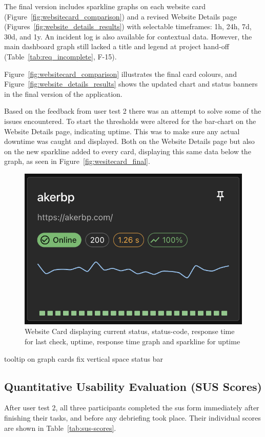 The final version includes sparkline graphs on each website card (Figure~\ref{fig:websitecard_comparison}) and a revised Website Details page (Figures~\ref{fig:website_details_results}) with selectable timeframes: 1h, 24h, 7d, 30d, and 1y.  
An incident log is also available for contextual data.  
However, the main dashboard graph still lacked a title and legend at project hand-off (Table~\ref{tab:req_incomplete}, F-15).

Figure~\ref{fig:websitecard_comparison} illustrates the final card colours, and Figure~\ref{fig:website_details_results} shows the updated chart and status banners in the final version of the application.

Based on the feedback from user test 2 there was an attempt to solve some of the issues encountered. To start the thresholds were altered for the bar-chart on the Website Details page, indicating uptime. This was to make sure any actual downtime was caught and displayed. Both on the Website Details page but also on the new sparkline added to every card, displaying this same data below the graph, as seen in Figure~\ref{fig:wesitecard_final}.  

\begin{figure}
    \centering
    \includegraphics[width=0.75\linewidth]{figures/websiteCard.png}
    \caption{Website Card displaying current status, status-code, response time for last check, uptime, response time graph and sparkline for uptime}
    \label{fig:websitecard_final}
\end{figure}


tooltip on graph cards
fix vertical space status bar








\subsection{Quantitative Usability Evaluation (SUS Scores)}
\label{subsec:quant_sus}
After user test 2, all three participants completed the \acrshort{sus} form immediately after finishing their tasks, and before any debriefing took place. Their individual scores are shown in Table~\ref{tab:sus-scores}.

